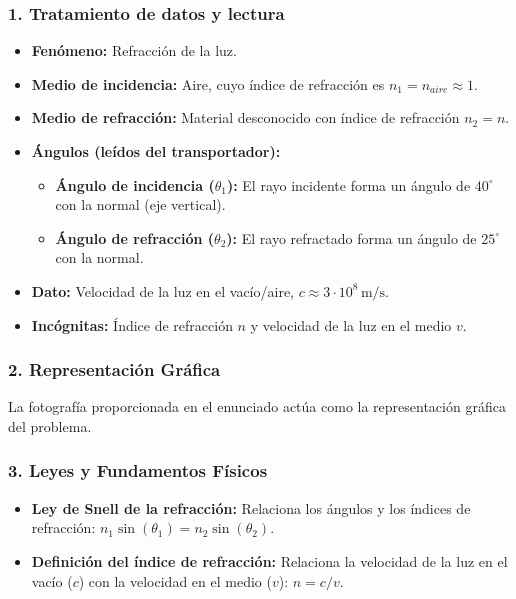 \subsubsection*{1. Tratamiento de datos y lectura}
\begin{itemize}
    \item \textbf{Fenómeno:} Refracción de la luz.
    \item \textbf{Medio de incidencia:} Aire, cuyo índice de refracción es $n_1 = n_{aire} \approx 1$.
    \item \textbf{Medio de refracción:} Material desconocido con índice de refracción $n_2=n$.
    \item \textbf{Ángulos (leídos del transportador):}
        \begin{itemize}
            \item \textbf{Ángulo de incidencia ($\theta_1$):} El rayo incidente forma un ángulo de $40^\circ$ con la normal (eje vertical).
            \item \textbf{Ángulo de refracción ($\theta_2$):} El rayo refractado forma un ángulo de $25^\circ$ con la normal.
        \end{itemize}
    \item \textbf{Dato:} Velocidad de la luz en el vacío/aire, $c \approx 3 \cdot 10^8 \, \text{m/s}$.
    \item \textbf{Incógnitas:} Índice de refracción $n$ y velocidad de la luz en el medio $v$.
\end{itemize}

\subsubsection*{2. Representación Gráfica}
La fotografía proporcionada en el enunciado actúa como la representación gráfica del problema.

\subsubsection*{3. Leyes y Fundamentos Físicos}
\begin{itemize}
    \item \textbf{Ley de Snell de la refracción:} Relaciona los ángulos y los índices de refracción: $n_1 \sin(\theta_1) = n_2 \sin(\theta_2)$.
    \item \textbf{Definición del índice de refracción:} Relaciona la velocidad de la luz en el vacío ($c$) con la velocidad en el medio ($v$): $n = c/v$.
\end{itemize}

